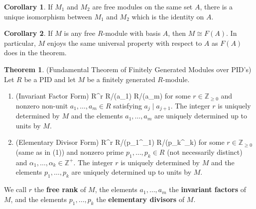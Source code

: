 \documentclass[12pt]{article}
\newcommand{\keyword}[1]{\textbf{#1}}
\def\[#1\]{\begin{align*}#1\end{align*}}
\theoremstyle{definition}
\newtheorem{theorem}{Theorem}
\newtheorem{corollary}{Corollary}
\newcommand{\Z}{\mathbb{Z}}
\newcommand{\<}{\left\langle}
\renewcommand{\>}{\right\rangle}
\newcommand{\isom}{\cong}
\newcommand{\dsum}{\oplus}
\newcommand{\divides}{\mid}
\begin{document}
\begin{corollary}
    If $M_1$ and $M_2$ are free modules on the same set $A$, there is a unique isomorphism between $M_1$ and $M_2$ which is the identity on $A$.
\end{corollary}

\begin{corollary}
    If $M$ is any free $R$-module with basis $A$, then $M \isom F(A)$. In particular, $M$ enjoys the same universal property with respect to $A$ as $F(A)$ does in the theorem.
\end{corollary}


\begin{theorem}(Fundamental Theorem of Finitely Generated Modules over PID's) Let $R$ be a PID and let $M$ be a finitely generated $R$-module.
    \begin{enumerate}[(1)]
        \item (Invariant Factor Form)
        \[
            M \isom R^r \dsum R/(a_1) \dsum \cdots \dsum R/(a_m)
        \]
        for some $r \in \Z_{\geq0}$ and nonzero non-unit $a_1, \dots, a_m \in R$ satisfying $a_j \divides a_{j+1}$. The integer $r$ is uniquely determined by $M$ and the elements $a_1, \dots, a_m$ are uniquely determined up to units by $M$.
        
        \item (Elementary Divisor Form)
        \[
            M \isom R^r \dsum R/(p_1^{\alpha_1}) \dsum \cdots \dsum R/(p_k^{\alpha_k})
        \]
        for some $r \in \Z_{\geq0}$ (same as in (1)) and nonzero prime $p_1, \dots, p_k \in R$ (not necessarily distinct) and $\alpha_1, \dots, \alpha_k \in \Z^+$. The integer $r$ is uniquely determined by $M$ and the elements $p_1, \dots, p_k$ are uniquely determined up to units by $M$.
    
        
    \end{enumerate}
    We call $r$ the \keyword{free rank} of $M$, the elements $a_1, \dots, a_m$ the \keyword{invariant factors} of $M$, and the elements $p_1, \dots, p_k$ the \keyword{elementary divisors} of $M$.
\end{theorem}
\end{document}
